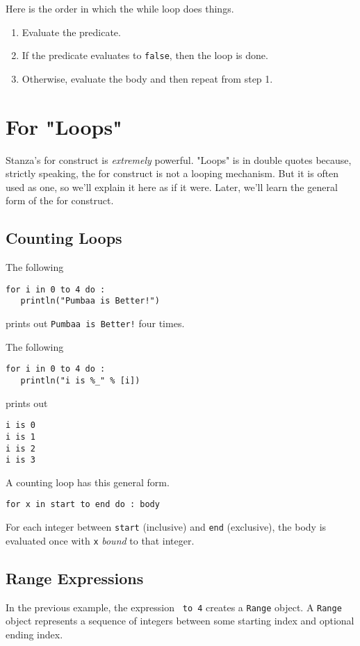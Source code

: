\documentclass[10pt,oneside]{book}
\begin{document}
Here is the order in which the while loop does things.
\begin{enumerate}
\item Evaluate the predicate.
\item If the predicate evaluates to \texttt{\frenchspacing false}, then the loop is done.
\item Otherwise, evaluate the body and then repeat from step 1. 
\end{enumerate}

\section{For "Loops"}
Stanza's for construct is {\em extremely} powerful. "Loops" is in double quotes because, strictly speaking, the for construct is not a looping mechanism. But it is often used as one, so we'll explain it here as if it were. Later, we'll learn the general form of the for construct.

\subsection*{Counting Loops}
The following
\begin{lstlisting}
for i in 0 to 4 do :
   println("Pumbaa is Better!")
\end{lstlisting}
prints out \texttt{\frenchspacing Pumbaa is Better!} four times. 

The following
\begin{lstlisting}
for i in 0 to 4 do :
   println("i is %_" % [i])
\end{lstlisting}
prints out
\begin{lstlisting}
i is 0
i is 1
i is 2
i is 3
\end{lstlisting}

A counting loop has this general form.
\begin{lstlisting}
for x in start to end do : body
\end{lstlisting}

For each integer between \texttt{\frenchspacing start} (inclusive) and \texttt{\frenchspacing end} (exclusive), the body is evaluated once with \texttt{\frenchspacing x} {\em bound} to that integer. 

\subsection*{Range Expressions}
In the previous example, the expression \texttt{ to 4} creates a \texttt{\frenchspacing Range} object. A \texttt{\frenchspacing Range} object represents a sequence of integers between some starting index and optional ending index.
\end{document}
